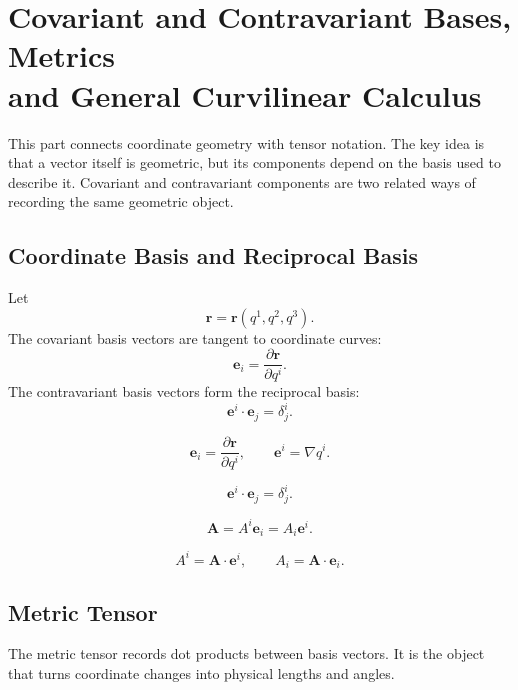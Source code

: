 \documentclass{otscience}
\begin{document}
\maketitle
\tableofcontents
\newpage
\fi

\section[
    Covariant and Contravariant Bases, Metrics and General Curvilinear Calculus
]{%
    Covariant and Contravariant Bases, Metrics\\
    and General Curvilinear Calculus%
}

This part connects coordinate geometry with tensor notation. The key idea is that a vector itself is geometric, but its components depend on the basis used to describe it. Covariant and contravariant components are two related ways of recording the same geometric object.

\subsection{Coordinate Basis and Reciprocal Basis}

Let
\[
    \mathbf{r}=\mathbf{r}(q^1,q^2,q^3).
\]
The covariant basis vectors are tangent to coordinate curves:
\[
    \mathbf{e}_i=\frac{\partial\mathbf{r}}{\partial q^i}.
\]
The contravariant basis vectors form the reciprocal basis:
\[
    \mathbf{e}^i\cdot\mathbf{e}_j=\delta^i_j.
\]

\begin{formulaboxnosplit}
    \[
        \mathbf{e}_i=\frac{\partial\mathbf{r}}{\partial q^i},
        \qquad
        \mathbf{e}^i=\nabla q^i.
    \]

    \[
        \mathbf{e}^i\cdot\mathbf{e}_j=\delta^i_j.
    \]

    \[
        \mathbf{A}=A^i\mathbf{e}_i=A_i\mathbf{e}^i.
    \]

    \[
        A^i=\mathbf{A}\cdot\mathbf{e}^i,
        \qquad
        A_i=\mathbf{A}\cdot\mathbf{e}_i.
    \]
\end{formulaboxnosplit}

\subsection{Metric Tensor}

The metric tensor records dot products between basis vectors. It is the object that turns coordinate changes into physical lengths and angles.
\end{document}
